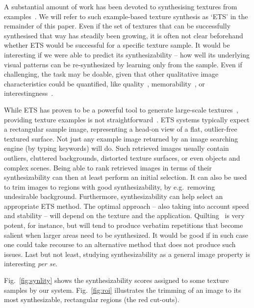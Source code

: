 A substantial amount of work has been devoted to synthesising textures
from examples~\citep{Heeger:95,
  Portilla:2000:IJCV,Efros:sig2001,Kwatra:2003, Lefebvre:2005:sig,
  Ma:2011,dai:facade:iccv13}. We will refer to such example-based
texture synthesis as `ETS' in the remainder of this paper. Even if the
set of textures that can be successfully synthesised that way has
steadily been growing, it is often not clear beforehand whether ETS
would be successful for a specific texture sample. It would be
interesting if we were able to predict its synthesizability -- how
well its underlying visual patterns can be re-synthesized by learning
only from the sample. Even if challenging, the task may be doable,
given that other qualitative image characteristics could be
quantified, like quality~\citep{image:quality},
memorability~\citep{image:memorability}, or
interestingness~\citep{image:interestingness}.


While ETS has proven to be a powerful tool to generate large-scale
textures~\citep{WLKT09}, providing texture examples is not
straightforward~\citep{lockerman2013arxiv}. ETS systems typically
expect a rectangular sample image, representing a head-on view of a
flat, outlier-free textured surface. Not just any example image
returned by an image searching engine (by typing keywords) will do.
Such retrieved images usually contain outliers, cluttered backgrounds,
distorted texture surfaces, or even objects and complex scenes. Being
able to rank retrieved images in terms of their synthesizability can
then at least perform an initial selection. It can also be used to
trim images to regions with good synthesizability, by e.g.~removing
undesirable background. Furthermore, synthesizability can help select
an appropriate ETS method. The optimal approach -- also taking into
account speed and stability -- will depend on the texture and the
application. Quilting~\citep{Efros:sig2001} is very potent, for
instance, but will tend to produce verbatim repetitions that become
salient when larger areas need to be synthesized. It would be good if
in such case one could take recourse to an alternative method that
does not produce such issues. Last but not least, studying
synthesizability as a general image property is interesting {\em per
  se}.

Fig.~\ref{fig:synlity} shows the synthesizability scores assigned to some texture samples 
by our system. Fig.~\ref{fig:roi} illustrates the trimming of an image to its most
synthesizable, rectangular regions (the red cut-outs).

